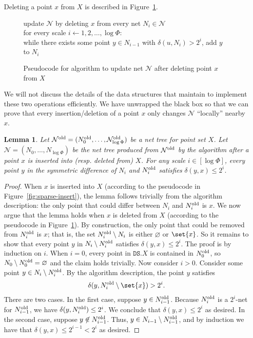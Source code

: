 \documentclass[11pt]{article}
\newtheorem{lemma}[theorem]{Lemma}
\newcommand{\cN}{\mathcal{N}}
\newcommand{\dist}{\ensuremath{\delta}}
\newcommand{\DS}{\texttt{DS}}
\newcommand{\points}{{\ensuremath{\DS.X}}}
\begin{document}
\noindent Deleting a point $x$ from $X$ is described in Figure~\ref{fig:sparse-delete}.
\begin{figure}[h!]
    \centering
    \begin{algorithm}
    update $\cN$ by deleting $x$ from every net $N_i \in \cN$
    \\ for every scale $i \gets 1, 2, \ldots, \log \Phi$:\+
    \\      while there exists some point $y \in N_{i-1}$ with $\dist(u, N_{i}) > 2^i$, add $y$ to $N_i$\-
    \end{algorithm}
    \caption{Pseudocode for \cite{gao2004deformable} algorithm to update net $\mathcal{N}$ after deleting point $x$ from $X$}
    \label{fig:sparse-delete}
\end{figure}

We will not discuss the details of the data structures that \cite{gao2004deformable} maintain to implement these two operations efficiently. We have unwrapped the \cite{gao2004deformable} black box so that we can prove that every insertion/deletion of a point $x$ only changes $\cN$ ``locally'' nearby $x$.
\begin{lemma}
\label{lem:net-delete-local}
Let $\cN^{\rm old} = (N_0^{\rm old}, \ldots, \cN_{\log \Phi}^{\rm old})$ be a net tree for point set $X$. Let $\cN = (N_0, \ldots, N_{\log \Phi})$ be the net tree produced from $\cN^{\rm old}$ by the \cite{gao2004deformable} algorithm after a point $x$ is inserted into (resp. deleted from) $X$. For any scale $i \in [\log \Phi]$, every point $y$ in the symmetric difference of $N_i$ and $N^{\rm old}_i$ satisfies $\dist(y,x) \le 2^i$.
\end{lemma}
\begin{proof}
When $x$ is inserted into $X$ (according to the pseudocode in Figure~\ref{fig:sparse-insert}), the lemma follows trivially from the \cite{gao2004deformable} algorithm description: the only point that could differ between $N_i$ and $N^{\rm old}_i$ is $x$. We now argue that the lemma holds when $x$ is deleted from $X$ (according to the pseudocode in Figure~\ref{fig:sparse-delete}).
    By construction, the only point that could be removed from $N_i^{\rm old}$ is $x$; that is, the set $N_i^{\rm old} \setminus N_i$ is either $\varnothing$ or $\set{x}$. So it remains to show that every point $y$ in $N_i \setminus N^{\rm old}_i$ satisfies $\dist(y,x) \le 2^i$.
% 
    The proof is by induction on $i$. When $i=0$, every point in $\points$ is contained in $N^{\rm old}_0$, so $N_0 \setminus N^{\rm old}_0 = \varnothing$ and the claim holds trivially. Now consider $i > 0$. Consider some point $y \in N_i \setminus N_i^{\rm old}$. By the algorithm description, the point $y$ satisfies
    \[\dist(y, N^{\rm old}_{i} \setminus \set{x}) > 2^i.\]
    There are two cases. In the first case, suppose $y \in N^{\rm old}_{i-1}$. Because $N^{\rm old}_{i}$ is a $2^i$-net for $N^{\rm old}_{i-1}$, we have $\dist(y, N^{\rm old}_i) \le 2^i$. We conclude that $\dist(y, x) \le 2^i$ as desired.
    In the second case, suppose $y \not \in N^{\rm old}_{i-1}$. Thus, $y \in N_{i-1} \setminus N^{\rm old}_{i-1}$, and by induction we have that $\dist(y, x) \le 2^{i-1} < 2^i$ as desired.
\end{proof}
\end{document}
